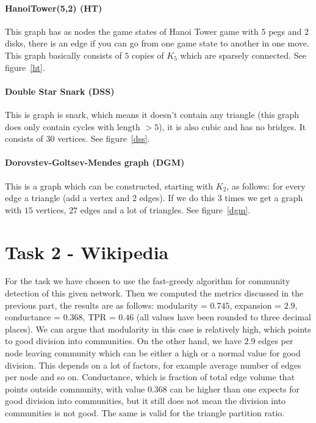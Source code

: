 \documentclass[paper=a4, fontsize=11pt]{scrartcl} %
\begin{document}
\paragraph{HanoiTower(5,2) (HT)}
This graph has as nodes the game states of Hanoi Tower game with $5$ pegs and $2$ disks, there is an edge if you can go from one game state to another in one move. This graph basically consists of $5$ copies of $K_{5}$ which are sparsely connected. See figure~\ref{ht}.
\paragraph{Double Star Snark (DSS)} This is graph is snark, which means it doesn't contain any triangle (this graph does only contain cycles with length $>5$), it is also cubic and has no bridges. It consists of $30$ vertices. See figure~\ref{dss}.
\paragraph{Dorovstev-Goltsev-Mendes graph (DGM)} This is a graph which can be constructed, starting with $K_{2}$, as follows: for every edge a triangle (add a vertex and 2 edges). If we do this $3$ times we get a graph with $15$ vertices, $27$ edges and a lot of triangles. See figure~\ref{dgm}.


\section{Task 2 - Wikipedia}

For the task we have chosen to use the fast-greedy algorithm for community detection of this given network. Then we computed the metrics discussed in the previous part, the results are as follows: modularity = $0.745$, expansion = $2.9$, conductance = $0.368$, TPR = $0.46$ (all values have been rounded to three decimal places). We can argue that modularity in this case is relatively high, which points to good division into communities. On the other hand, we have $2.9$ edges per node leaving community which can be either a high or a normal value for good division. This depends on a lot of factors, for example average number of edges per node and so on. Conductance, which is fraction of total edge volume that points outside community, with value $0.368$ can be higher than one expects for good division into communities, but it still does not mean the division into communities is not good. The same is valid for the triangle partition ratio.
\end{document}
